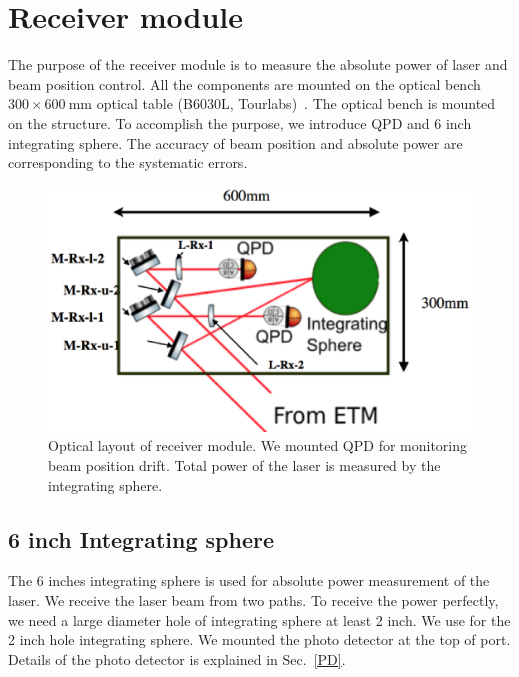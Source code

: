 \section{Receiver module}
The purpose of the receiver module is to measure the absolute power of laser and beam position control.
All the components are mounted on the optical bench $300 \times 600~\mathrm{mm}$ optical table (B6030L, Tourlabs)~\cite{Thorlabs}. 
The optical bench is mounted on the structure.
To accomplish the purpose, we introduce QPD and  6 inch integrating sphere.
The accuracy of beam position and absolute power are corresponding to the systematic errors. 
\begin{figure}
\begin{center}
\includegraphics[width=14cm]{Figures/Rx_module_layout.eps}
\caption{Optical layout of receiver module. We mounted QPD for monitoring beam position drift. Total power of the laser is measured by the integrating sphere.} 
\label{fig:Rx_module_layout} 
\end{center}
\end{figure}
\subsection{6 inch Integrating sphere}
The 6 inches integrating sphere is used for absolute power measurement of the laser. We receive the laser beam from two paths. To receive the power perfectly, we need a large diameter hole of integrating sphere at least 2 inch. We use for the 2 inch hole integrating sphere. We mounted the photo detector at the top of port. Details of the photo detector is explained in Sec.~\ref{PD}.

